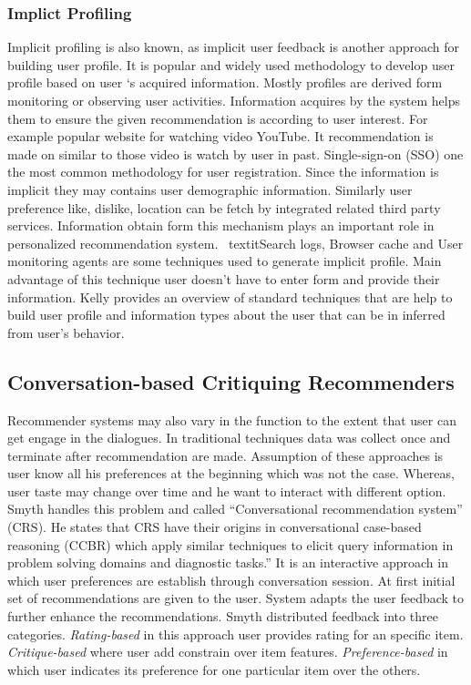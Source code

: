 \subsubsection{Implict Profiling}

Implicit profiling is also known, as implicit user feedback is another approach for building user profile. It is popular and widely used methodology to develop user profile based on user ‘s acquired information. Mostly profiles are derived form monitoring or observing user activities.  Information acquires by the system helps them to ensure the given recommendation is according to user interest. For example popular website for watching video YouTube. It recommendation is made on similar to those video is watch by user in past.  Single-sign-on (SSO) \cite{hursti1997single} one the most common methodology for user registration. Since the information is implicit they may contains user demographic information. Similarly user preference like, dislike, location can be fetch by integrated related third party services. Information obtain form this mechanism plays an important role in personalized recommendation system. \ textit{Search logs, Browser cache and User monitoring agents} are some techniques used to generate implicit profile. Main advantage of this technique user doesn’t have to enter form and provide their information. Kelly \cite{schiaffino2009intelligent} provides an overview of standard techniques that are help to build user profile and information types about the user that can be in inferred from user’s behavior.\newline

\subsection{Conversation-based Critiquing Recommenders}

Recommender systems may also vary in the function to the extent that user can get engage in the dialogues. In traditional techniques data was collect once and terminate after recommendation are made. Assumption of these approaches is user know all his preferences at the beginning which was not the case. Whereas, user taste may change over time and he want to interact with different option. Smyth \cite{ mcginty2003role} handles this problem and called “Conversational recommendation system” (CRS). He states that CRS have their origins in conversational case-based reasoning (CCBR) which apply similar techniques to elicit query information in problem solving domains and diagnostic tasks.” It is an interactive approach in which user preferences are establish through conversation session. At first initial set of recommendations are given to the user. System adapts the user feedback to further enhance the recommendations. Smyth \cite{ mcginty2003role} distributed feedback into three categories.\textit{ Rating-based} in this approach user provides rating for an specific item.\textit{ Critique-based} where user add constrain over item features.\textit{ Preference-based } in which user indicates its preference for one particular item over the others.\newline

